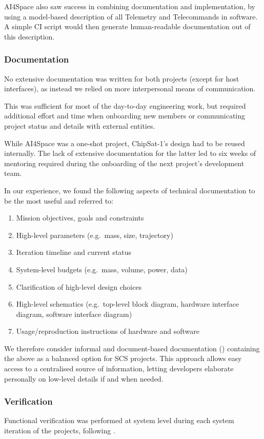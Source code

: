 \documentclass[journal,10pt]{IEEEtran}
\begin{document}
AI4Space also saw success in combining documentation and implementation, by using a model-based description of all Telemetry and Telecommands in software. A simple \ac{CI} script would then generate human-readable documentation out of this description.

\subsubsection{Documentation}
No extensive documentation was written for both projects (except for host interfaces), as instead we relied on more
interpersonal means of communication.

This was sufficient for most of the day-to-day engineering work, but required additional effort and time when onboarding new members or communicating project status and details with external entities.

While AI4Space was a one-shot project, ChipSat-1's design had to be reused internally. The lack of extensive documentation for the latter led to six weeks of mentoring required during the onboarding of the next project's development team.


In our experience, we found the following aspects of technical documentation to be the most useful and referred to:
\begin{enumerate}
\item Mission objectives, goals and constraints
\item High-level parameters (e.g.~mass, size, trajectory)
\item Iteration timeline and current status
\item System-level budgets (e.g.~mass, volume, power, data)
\item Clarification of high-level design choices
\item High-level schematics (e.g.~top-level block diagram, hardware interface diagram, software interface diagram)
\item Usage/reproduction instructions of hardware and software
\end{enumerate}

We therefore consider informal and document-based documentation () containing the above as a balanced option for \acs{SCS} projects. This approach allows easy access to a centralised source of information, letting developers elaborate personally on low-level details if and when needed.


\subsubsection{Verification}
Functional verification was performed at system level during each system iteration of the projects, following .
\end{document}
